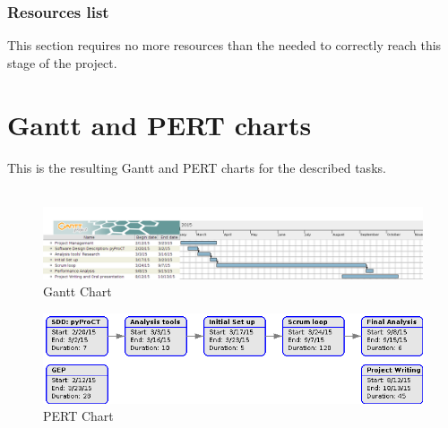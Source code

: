 \subsubsection{Resources list}

This section requires no more resources than the needed to correctly reach this stage of the project. 


\section{Gantt and PERT charts}
\label{sec:gantt_pert}

This is the resulting Gantt and PERT charts for the described tasks.
\\
\\

\begin{figure}[h]
\includegraphics[width=\textwidth]{img/gantt.png}
\caption{Gantt Chart}
\end{figure}
\begin{figure}[h]
\includegraphics[width=\textwidth]{img/pert.png}
\caption{PERT Chart}
\end{figure}

\FloatBarrier
